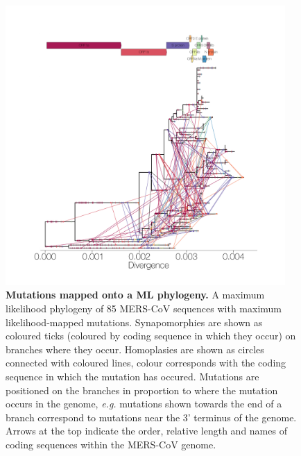 \documentclass[11pt,oneside,letterpaper]{article}
\begin{document}
\begin{figure}[h!]
	\centering
	\includegraphics[width=0.95\textwidth]{figures/MERS_homoplasyMap_noLabels.png}
	\caption{\textbf{Mutations mapped onto a ML phylogeny.}
A maximum likelihood phylogeny of 85 MERS-CoV sequences with maximum likelihood-mapped mutations.
Synapomorphies are shown as coloured ticks (coloured by coding sequence in which they occur) on branches where they occur.
Homoplasies are shown as circles connected with coloured lines, colour corresponds with the coding sequence in which the mutation has occured.
Mutations are positioned on the branches in proportion to where the mutation occurs in the genome, \textit{e.g.} mutations shown towards the end of a branch correspond to mutations near the 3' terminus of the genome.
Arrows at the top indicate the order, relative length and names of coding sequences within the MERS-CoV genome.}
	\label{homoplasyTree}
\end{figure}

%
\end{document}
